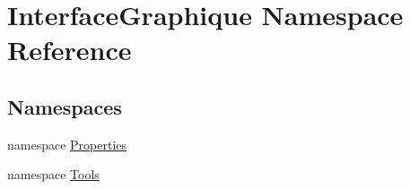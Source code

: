\hypertarget{namespace_interface_graphique}{}\section{Interface\+Graphique Namespace Reference}
\label{namespace_interface_graphique}
\subsection*{Namespaces}
\begin{DoxyCompactItemize}
\item 
namespace \hyperlink{namespace_interface_graphique_1_1_properties}{Properties}
\item 
namespace \hyperlink{namespace_interface_graphique_1_1_tools}{Tools}
\end{DoxyCompactItemize}
